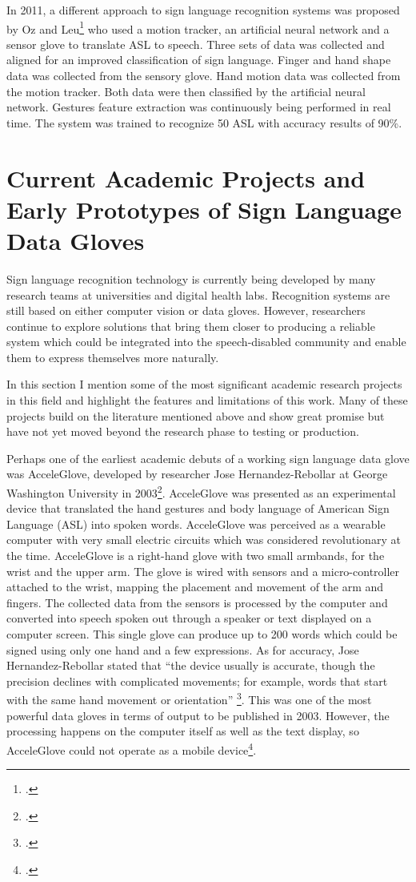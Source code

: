 In 2011, a different approach to sign language recognition systems was proposed by Oz and Leu\footcite{Oz2011} who used a motion tracker, an artificial neural network and a sensor glove to translate ASL to speech. Three sets of data was collected and aligned for an improved classification of sign language. Finger and hand shape data was collected from the sensory glove. Hand motion data was collected from the motion tracker. Both data were then classified by the artificial neural network. Gestures feature extraction was continuously being performed in real time. The system was trained to recognize 50 ASL with accuracy results of 90\%. 


\section{Current Academic Projects and Early Prototypes of Sign Language Data Gloves}

Sign language recognition technology is currently being developed by many research teams at universities and digital health labs. Recognition systems are still based on either computer vision or data gloves. However, researchers continue to explore solutions that bring them closer to producing a reliable system which could be integrated into the speech-disabled community and enable them to express themselves more naturally.

In this section I mention some of the most significant academic research projects in this field and highlight the features and limitations of this work. Many of these projects build on the literature mentioned above and show great promise but have not yet moved beyond the research phase to testing or production.

Perhaps one of the earliest academic debuts of a working sign language data glove was AcceleGlove, developed by researcher Jose Hernandez-Rebollar at George Washington University in 2003\footcite{AcceleGlove2016}. AcceleGlove was presented as an experimental device that translated the hand gestures and body language of American Sign Language (ASL) into spoken words. AcceleGlove was perceived as a wearable computer with very small electric circuits which was considered revolutionary at the time. AcceleGlove is a right-hand glove with two small armbands, for the wrist and the upper arm. The glove is wired with sensors and a micro-controller attached to the wrist, mapping the placement and movement of the arm and fingers. The collected data from the sensors is processed by the computer and converted into speech spoken out through a speaker or text displayed on a computer screen. This single glove can produce up to 200 words which could be signed using only one hand and a few expressions. As for accuracy, Jose Hernandez-Rebollar stated that ``the device usually is accurate, though the precision declines with complicated movements; for example, words that start with the same hand movement or orientation'' \footcite{AcceleGlove2016}. This was one of the most powerful data gloves in terms of output to be published in 2003. However, the processing happens on the computer itself as well as the text display, so AcceleGlove could not operate as a mobile device\footcite{AcceleGlove2016}. 


